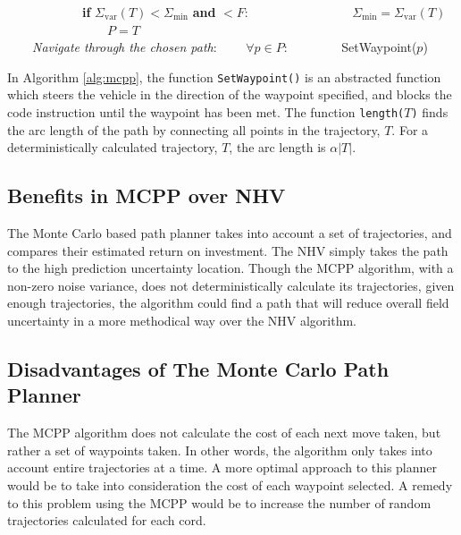 \begin{algorithm}[h!]
\begin{algorithmic}[1]
	\State \ \ \ \  \ \ \ \  \ \ \ \ \textbf{if} $\Sigma_{\text{var}}(T) < \Sigma_{\text{min}}$ \textbf{and}  $< F$:
	\State \ \ \ \  \ \ \ \  \ \ \ \ \ \ \ \ $\Sigma_{\text{min}} = \Sigma_{\text{var}}(T)$
	\State \ \ \ \  \ \ \ \  \ \ \ \ \ \ \ \ $P = T$\\

	\BState \ \ \ \  \emph{Navigate through the chosen path}:
	\State \ \ \ \  $\forall p \in P$:
	\State \ \ \ \  \ \ \ \ SetWaypoint($p$) 
\EndProcedure
\end{algorithmic}
\end{algorithm}

In Algorithm \ref{alg:mcpp}, the function \texttt{SetWaypoint()} is an abstracted function which steers the vehicle in the direction of the waypoint specified, and blocks the code instruction until the waypoint has been met. The function \texttt{length(}$T$\texttt{)} finds the arc length of the path by connecting all points in the trajectory, $T$. For a deterministically calculated trajectory, $T$, the arc length is $\alpha |T|$.
 
\subsection{Benefits in MCPP over NHV}
The Monte Carlo based path planner takes into account a set of trajectories, and compares their estimated return on investment. The NHV simply takes the path to the high prediction uncertainty location. Though the MCPP algorithm, with a non-zero noise variance, does not deterministically calculate its trajectories, given enough trajectories, the algorithm could find a path that will reduce overall field uncertainty in a more methodical way over the NHV algorithm.

\subsection{Disadvantages of The Monte Carlo Path Planner}
The MCPP algorithm does not calculate the cost of each next move taken, but rather a set of waypoints taken. In other words, the algorithm only takes into account entire trajectories at a time. A more optimal approach to this planner would be to take into consideration the cost of each waypoint selected. A remedy to this problem using the MCPP would be to increase the number of random trajectories calculated for each cord.
